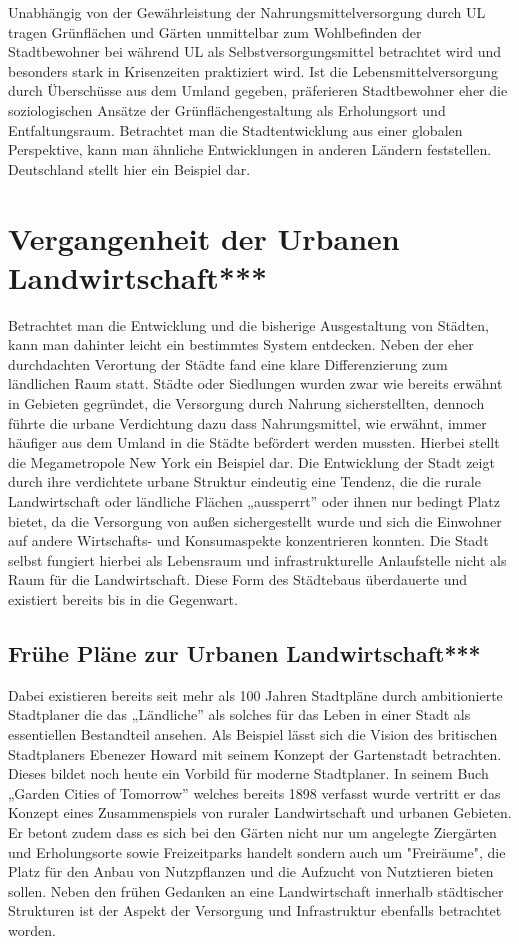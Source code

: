 \documentclass{scrartcl}
\begin{document}
Unabhängig von der Gewährleistung der Nahrungsmittelversorgung durch UL tragen Grünflächen und Gärten unmittelbar zum Wohlbefinden der Stadtbewohner bei während UL als Selbstversorgungsmittel betrachtet wird und besonders stark in Krisenzeiten praktiziert wird. Ist die Lebensmittelversorgung durch Überschüsse aus dem Umland gegeben, präferieren Stadtbewohner eher die soziologischen Ansätze der Grünflächengestaltung als Erholungsort und Entfaltungsraum. Betrachtet man die Stadtentwicklung aus einer globalen Perspektive, kann man ähnliche Entwicklungen in anderen Ländern feststellen. Deutschland stellt hier ein Beispiel dar.


\section{Vergangenheit der Urbanen Landwirtschaft***}

Betrachtet man die Entwicklung und die bisherige Ausgestaltung von Städten, kann man dahinter leicht ein bestimmtes System entdecken. Neben der eher durchdachten Verortung der Städte fand eine klare Differenzierung zum ländlichen Raum statt. Städte oder Siedlungen wurden
zwar wie bereits erwähnt in Gebieten gegründet, die Versorgung durch Nahrung sicherstellten, dennoch führte die urbane Verdichtung dazu dass Nahrungsmittel, wie erwähnt, immer häufiger aus dem Umland in die Städte befördert werden mussten. Hierbei stellt die Megametropole New York ein Beispiel dar. Die Entwicklung der Stadt zeigt durch ihre verdichtete urbane Struktur eindeutig eine Tendenz, die die rurale Landwirtschaft oder ländliche Flächen „aussperrt” oder ihnen nur bedingt Platz bietet, da die Versorgung von außen sichergestellt wurde und sich die Einwohner auf andere Wirtschafts- und Konsumaspekte konzentrieren konnten. Die Stadt selbst fungiert hierbei als Lebensraum und infrastrukturelle Anlaufstelle nicht als Raum für die Landwirtschaft. Diese Form des Städtebaus überdauerte und existiert bereits bis in die Gegenwart.

\subsection{Frühe Pläne zur Urbanen Landwirtschaft***}
Dabei existieren bereits seit mehr als 100 Jahren Stadtpläne durch ambitionierte Stadtplaner die das „Ländliche” als solches für das Leben in einer
Stadt als essentiellen Bestandteil ansehen. Als Beispiel lässt sich die Vision des britischen Stadtplaners Ebenezer Howard mit seinem Konzept der Gartenstadt betrachten. Dieses bildet noch heute ein Vorbild für moderne Stadtplaner. In seinem Buch „Garden Cities of Tomorrow” welches bereits 1898 verfasst wurde vertritt er das Konzept eines Zusammenspiels von ruraler Landwirtschaft und urbanen Gebieten. Er betont zudem dass es sich bei den
Gärten nicht nur um angelegte Ziergärten und Erholungsorte sowie Freizeitparks handelt sondern auch um "Freiräume", die Platz für den Anbau von
Nutzpflanzen und die Aufzucht von Nutztieren bieten sollen. Neben den frühen Gedanken an eine Landwirtschaft innerhalb städtischer Strukturen ist der Aspekt der Versorgung und Infrastruktur ebenfalls betrachtet worden.
\end{document}
